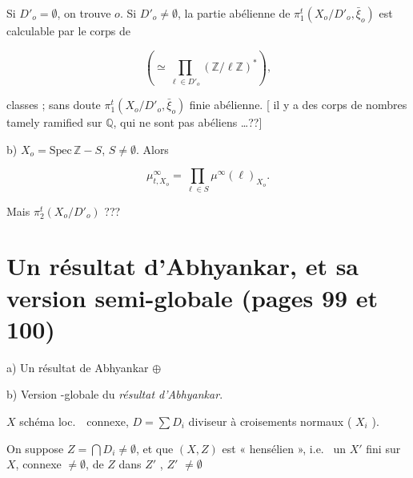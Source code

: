 \documentclass[11pt,a4paper]{article}
\begin{document}
 Si $D'_{o} = \emptyset$, on trouve $o$. Si $D'_{o} \neq
\emptyset$, la partie abélienne de $\pi_{1}^{t}(X_{o}/D'_{o},
\bar{\xi}_{o})$ est calculable par le corps de

\[ \left(\simeq \prod_{\ell \in D'_{o}} (\mathbb{Z}/\ell\mathbb{Z})^{*}\right), \]

classes ; sans doute $\pi_{1}^{t}(X_{o}/D'_{o}, \bar{\xi}_{o})$ 
\ill{} finie \ill{} abélienne. [\ill{} il y a des
\struck{\ill{}} corps de nombres tamely ramified sur $\mathbb{Q}$, qui ne
sont pas abéliens \ldots ??]

b) $X_{o} = \mathrm{Spec}\, \mathbb{Z} - S$, $S \neq \emptyset$. Alors

\[ \mu^{\infty}_{t, X_{o}} = \prod_{\ell \in S} \mu^{\infty}(\ell)_{X_{o}}. \]

Mais \ill{} $\pi_{2}^{t}(X_{o}/D'_{o})$ ???

\section*{Un résultat d'Abhyankar, et sa version semi-globale (pages 99 et 100)}




a) Un résultat de Abhyankar $\oplus$

b) Version -globale du \struck{\ill{}} \emph{résultat
d'Abhyankar}.

$X$ schéma loc.\ \ connexe, $D = \sum D_{i}$ diviseur
 \add{\ill{}} à croisements normaux (
$X_{i}$ ).

On suppose $Z = \bigcap D_{i} \neq \emptyset$, et que $(X, Z)$ est
« hensélien », i.e.\ \ill{} un  $X'$ fini sur $X$, connexe $\neq
\emptyset$, \ill{} de $Z$ dans $Z'$ , $Z'$ \ill{} $\neq \emptyset$ \ill{}
\end{document}

